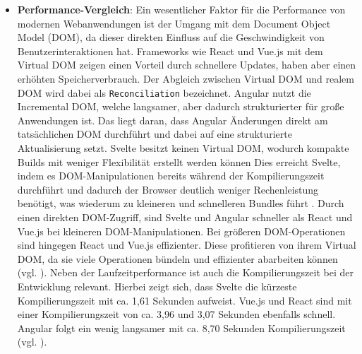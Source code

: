 \documentclass[oneside]{ausarbeitung}
\begin{document}
\begin{itemize}
\item \textbf{Performance-Vergleich}: 
Ein wesentlicher Faktor für die Performance von modernen Webanwendungen ist der Umgang mit dem Document Object Model (DOM), da dieser direkten Einfluss auf die Geschwindigkeit von Benutzerinteraktionen hat. 
Frameworks wie React und Vue.js mit dem Virtual DOM zeigen einen Vorteil durch schnellere Updates, haben aber einen erhöhten Speicherverbrauch. Der Abgleich zwischen Virtual DOM und realem DOM wird dabei als \texttt{Reconciliation} bezeichnet. Angular nutzt die Incremental DOM, welche langsamer, aber dadurch strukturierter für große Anwendungen ist. Das liegt daran, dass Angular Änderungen direkt am tatsächlichen DOM durchführt und dabei auf eine strukturierte Aktualisierung setzt. Svelte besitzt keinen Virtual DOM, wodurch kompakte Builds mit weniger Flexibilität erstellt werden können \parencite[S.61]{js-framework-comparison}
Dies erreicht Svelte, indem es DOM-Manipulationen bereits während der Kompilierungszeit durchführt und dadurch der Browser deutlich weniger Rechenleistung benötigt, was wiederum zu kleineren und schnelleren Bundles führt \parencite[S.26]{comparison-frameworks-scalable-apps}. Durch einen direkten DOM-Zugriff, sind Svelte und Angular schneller als React und Vue.js bei kleineren DOM-Manipulationen. Bei größeren DOM-Operationen sind hingegen React und Vue.js effizienter. Diese profitieren von ihrem Virtual DOM, da sie viele Operationen bündeln und effizienter abarbeiten können (vgl. \autocite[S.60-62]{js-framework-comparison}). 
Neben der Laufzeitperformance ist auch die Kompilierungszeit bei der Entwicklung relevant. Hierbei zeigt sich, dass Svelte die kürzeste  Kompilierungszeit mit ca. 1,61 Sekunden aufweist. Vue.js und React sind mit einer Kompilierungszeit von ca. 3,96 und 3,07 Sekunden ebenfalls schnell. Angular folgt ein wenig langsamer mit ca. 8,70 Sekunden Kompilierungszeit (vgl. \autocite[S.65]{js-framework-comparison}).
    

\end{itemize}
\end{document}
